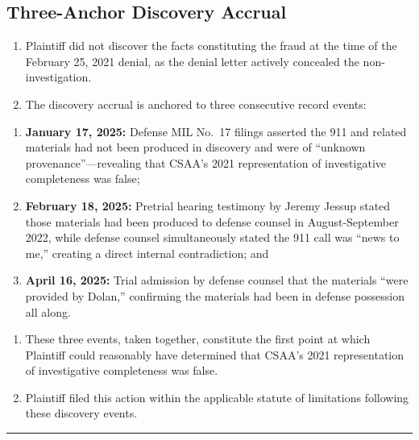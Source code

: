 \subsection{Three-Anchor Discovery Accrual}\label{three-anchor-discovery-accrual}

\begin{enumerate}
\def\labelenumi{\arabic{enumi}.}
\setcounter{enumi}{47}
\item
  Plaintiff did not discover the facts constituting the fraud at the time of the February 25, 2021 denial, as the denial letter actively concealed the non-investigation.
\item
  The discovery accrual is anchored to three consecutive record events:
\end{enumerate}

\begin{enumerate}
\def\labelenumi{(\alph{enumi})}
\item
  \textbf{January 17, 2025:} Defense MIL No.~17 filings asserted the 911 and related materials had not been produced in discovery and were of ``unknown provenance''---revealing that CSAA's 2021 representation of investigative completeness was false;
\item
  \textbf{February 18, 2025:} Pretrial hearing testimony by Jeremy Jessup stated those materials had been produced to defense counsel in August-September 2022, while defense counsel simultaneously stated the 911 call was ``news to me,'' creating a direct internal contradiction; and
\item
  \textbf{April 16, 2025:} Trial admission by defense counsel that the materials ``were provided by Dolan,'' confirming the materials had been in defense possession all along.
\end{enumerate}

\begin{enumerate}
\def\labelenumi{\arabic{enumi}.}
\setcounter{enumi}{49}
\item
  These three events, taken together, constitute the first point at which Plaintiff could reasonably have determined that CSAA's 2021 representation of investigative completeness was false.
\item
  Plaintiff filed this action within the applicable statute of limitations following these discovery events.
\end{enumerate}

\begin{center}\rule{0.5\linewidth}{0.5pt}\end{center}

